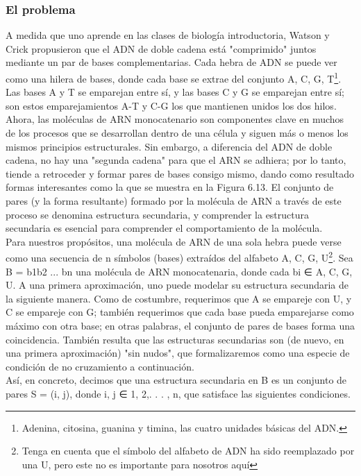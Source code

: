 \documentclass[a4paper]{article}
\begin{document}
\subsubsection*{El problema}

A medida que uno aprende en las clases de biología introductoria, Watson y Crick propusieron que el ADN de doble cadena está "comprimido" juntos mediante un par de bases complementarias. Cada hebra de ADN se puede ver como una hilera de bases, donde cada base se extrae del conjunto {A, C, G, T}\footnote{Adenina, citosina, guanina y timina, las cuatro unidades básicas del ADN.}.  Las bases A y T se emparejan entre sí, y las bases C y G se emparejan entre sí; son estos emparejamientos A-T y C-G los que mantienen unidos los dos hilos.\\

Ahora, las moléculas de ARN monocatenario son componentes clave en muchos de los procesos que se desarrollan dentro de una célula y siguen más o menos los mismos principios estructurales. Sin embargo, a diferencia del ADN de doble cadena, no hay una "segunda cadena" para que el ARN se adhiera; por lo tanto, tiende a retroceder y formar pares de bases consigo mismo, dando como resultado formas interesantes como la que se muestra en la Figura 6.13. El conjunto de pares (y la forma resultante) formado por la molécula de ARN a través de este proceso se denomina estructura secundaria, y comprender la estructura secundaria es esencial para comprender el comportamiento de la molécula.\\

Para nuestros propósitos, una molécula de ARN de una sola hebra puede verse como una secuencia de n símbolos (bases) extraídos del alfabeto {A, C, G, U}\footnote{Tenga en cuenta que el símbolo del alfabeto de ADN ha sido reemplazado por una U, pero este no es importante para nosotros aquí}. Sea B = b1b2 ... bn una molécula de ARN monocatenaria, donde cada bi ∈ {A, C, G, U}. A una primera aproximación, uno puede modelar su estructura secundaria de la siguiente manera. Como de costumbre, requerimos que A se empareje con U, y C se empareje con G; también requerimos que cada base pueda emparejarse como máximo con otra base; en otras palabras, el conjunto de pares de bases forma una coincidencia. También resulta que las estructuras secundarias son (de nuevo, en una primera aproximación) "sin nudos", que formalizaremos como una especie de condición de no cruzamiento a continuación.\\

Así, en concreto, decimos que una estructura secundaria en B es un conjunto de pares S = {(i, j)}, donde i, j ∈ {1, 2,. . . , n}, que satisface las siguientes condiciones.\\
\end{document}
